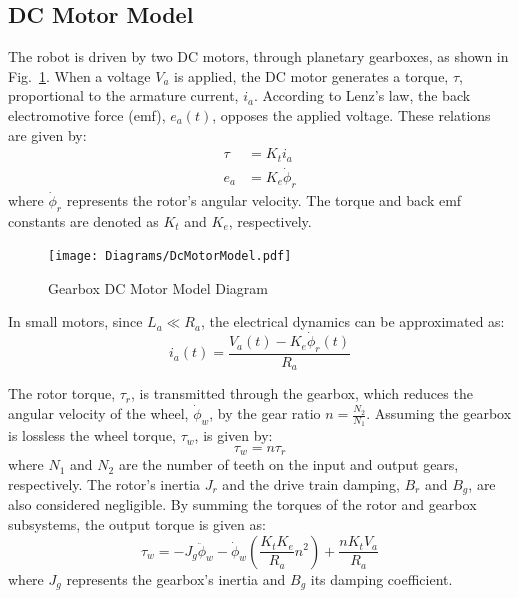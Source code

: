         
        \subsection{DC Motor Model}    
    The robot is driven by two DC motors, through planetary gearboxes, as shown in Fig.~\ref{fig:DCMotor}.
    When a voltage $V_a$ is applied, the DC motor generates a torque, $\tau$, 
    proportional to the armature current, $i_a$.
    According to Lenz's law, the back electromotive force (emf), $e_a(t)$, 
    opposes the applied voltage. These relations are given by:
        \begin{subequations}
            \begin{align}
                \tau &= K_t i_a \\
    e_a &= K_e \dot{\phi}_r
            \end{align}
        \end{subequations}
    where $\dot{\phi}_r$ represents the rotor's angular velocity. The torque 
    and back emf constants are denoted as $K_t$ and $K_e$, respectively.
        \begin{figure}[H]
            \centering
                \texttt{[image: Diagrams/DcMotorModel.pdf]}
            \caption{Gearbox DC Motor Model Diagram}
            \label{fig:DCMotor}
        \end{figure}
    In small motors, since $L_a \ll R_a$, the electrical dynamics can be approximated as:
        \begin{equation}
    i_a (t) = \frac{V_a (t) - K_e \dot{\phi}_r (t)}{R_a}
        \end{equation}

    The rotor torque, $\tau_r$, is transmitted through the gearbox, which 
    reduces the angular velocity of the wheel, $\dot{\phi}_w$, by the gear ratio $n = \frac{N_2}{N_1}$. 
    Assuming the gearbox is lossless the wheel torque, $\tau_w$, is given by:
        \begin{equation}
                \tau_w = n\tau_r
        \end{equation}
    where $N_1$ and $N_2$ are the number of teeth on the input and output gears, respectively.
    The rotor's inertia $J_r$ and the drive train damping, $B_r$ and $B_g$, are also considered negligible.
    By summing the torques of the rotor and gearbox subsystems, the output torque is given as:
        \begin{equation}
            \tau_w = - J_g \ddot{\phi}_w - \dot{\phi}_w \left( \frac{K_t K_e}{R_a} n^2 \right) + \frac{n K_t V_a}{R_a}
            \label{eq:DCMotorTorque}
        \end{equation}
    where $J_g$ represents the gearbox's inertia and $B_g$ its damping coefficient.


